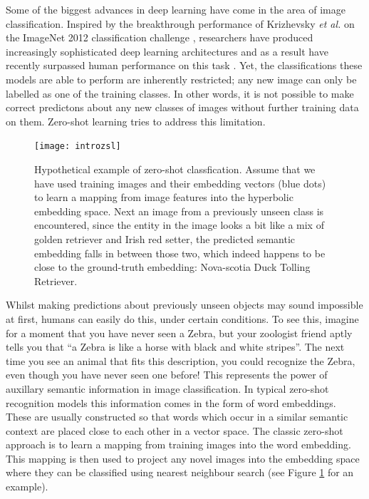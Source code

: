 \documentclass[12pt]{report}
\begin{document}
Some of the biggest advances in deep learning have come in the area of image classification. Inspired by the breakthrough performance of Krizhevsky \textit{et al.} \cite{Krizhevsky2012} on the ImageNet 2012 classification challenge \cite{JiaDeng2009}, researchers have produced increasingly sophisticated deep learning architectures and as a result have recently surpassed human performance on this task \cite{Dodge2017}. Yet, the classifications these models are able to perform are inherently restricted; any new image can only be labelled as one of the training classes. In other words, it is not possible to make correct predictons about any new classes of images without further training data on them. Zero-shot learning \cite{Palatucci2009} tries to address this limitation.

\begin{figure}
  \centering
	\texttt{[image: introzsl]}
	\caption{Hypothetical example of zero-shot classfication. Assume that we have used training images and their embedding vectors (blue dots) to learn a mapping from image features into the hyperbolic embedding space. Next an image from a previously unseen class is encountered, since the entity in the image looks a bit like a mix of golden retriever and Irish red setter, the predicted semantic embedding falls in between those two, which indeed happens to be close to the ground-truth embedding: Nova-scotia Duck Tolling Retriever.}
	\label{fig:intro}
\end{figure}

Whilst making predictions about previously unseen objects may sound impossible at first, humans can easily do this, under certain conditions. To see this, imagine for a moment that you have never seen a Zebra, but your zoologist friend aptly tells you that ``a Zebra is like a horse with black and white stripes''. The next time you see an animal that fits this description, you could recognize the Zebra, even though you have never seen one before! This represents the power of auxillary semantic information in image classification. In typical zero-shot recognition models this information comes in the form of word embeddings. These are usually constructed so that words which occur in a similar semantic context are placed close to each other in a vector space. The classic zero-shot approach is to learn a mapping from training images into the word embedding. This mapping is then used to project any novel images into the embedding space where they can be classified using nearest neighbour search (see Figure \ref{fig:intro} for an example). 
\end{document}
